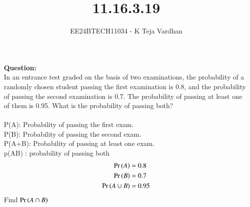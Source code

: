 \documentclass[journal]{IEEEtran}
\begin{document}

\vspace{3cm}

\title{11.16.3.19}
\author{EE24BTECH11034 - K Teja Vardhan}
{\let\newpage\relax\maketitle}
\textbf{Question:\\}
In an entrance test graded on the basis of two examinations, the probability of a randomly chosen student passing the first examination is 0.8, and the probability of passing the second examination is 0.7. The probability of passing at least one of them is 0.95. What is the probability of passing both?\\
\solution\\


P(A): Probability of passing the first exam.\\
P(B): Probability of passing the second exam.\\
P(A+B): Probability of passing at least one exam.\\
p(AB) : probability of passing both\\
\begin{align}
	\Pr\left(A\right) &= 0.8\\
	\Pr\left(B\right) &= 0.7\\
	\Pr\left(A \cup B\right) &= 0.95
\end{align}
Find \(\Pr\left(A \cap B\right)\)\\
\end{document}
